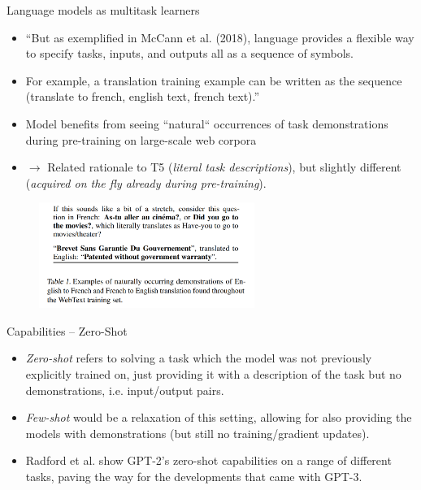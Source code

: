 \begin{frame}{Language models as multitask learners}

\vfill

\begin{itemize}

\item[] ``But as exemplified in McCann et al. (2018), language
	provides a flexible way to specify tasks, inputs,
	and outputs all as a sequence of symbols.

\item[] For
	example, a translation training
	example can be written as the sequence (translate to
	french, english text, french text).''
	\item Model benefits from seeing ``natural`` occurrences of task demonstrations during pre-training on large-scale web corpora
	\item[] $\to$ Related rationale to T5 (\textit{literal task descriptions}), but slightly different (\textit{acquired on the fly already during pre-training}).
\end{itemize}

\begin{figure}
\centering
\includegraphics[width = 7cm]{figure/72-gpt2-demo-wild.png}\\ 
\end{figure}

\vfill

\end{frame}




\begin{frame}{Capabilities -- Zero-Shot}

\vfill

\begin{itemize}
	\item \textit{Zero-shot} refers to solving a task which the model was not previously explicitly trained on, just providing it with a description of the task but no demonstrations, i.e. input/output pairs.
	\item \textit{Few-shot} would be a relaxation of this setting, allowing for also providing the models with demonstrations (but still no training/gradient updates).
	\item Radford et al. show GPT-2's zero-shot capabilities on a range of different tasks, paving the way for the developments that came with GPT-3.
\end{itemize}

\vfill

\end{frame}

